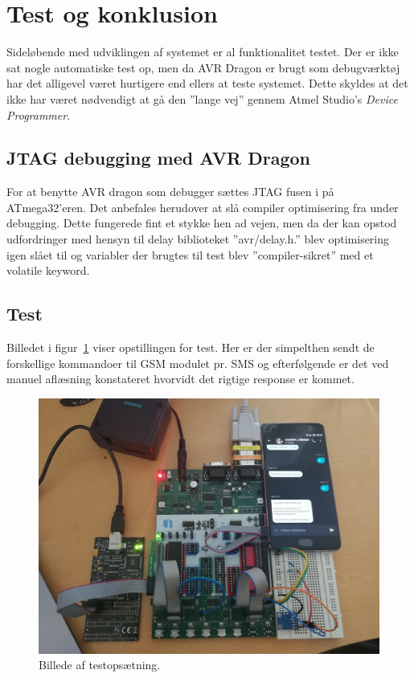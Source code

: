 \section{Test og konklusion}

Sideløbende med udviklingen af systemet er al funktionalitet testet. Der er ikke sat nogle automatiske test op, men da AVR Dragon er brugt som debugværktøj har det alligevel 
været hurtigere end ellers at teste systemet. Dette skyldes at det ikke har været nødvendigt at gå den ''lange vej'' gennem Atmel Studio's \textit{Device Programmer}.

\subsection{JTAG debugging med AVR Dragon}

For at benytte AVR dragon som debugger sættes JTAG fusen i på ATmega32'eren. Det anbefales herudover at slå compiler optimisering fra under debugging. 
Dette fungerede fint et stykke hen ad vejen, men da der kan opstod udfordringer med hensyn til delay biblioteket ''avr/delay.h.'' blev optimisering igen slået til og variabler der brugtes
til test blev ''compiler-sikret'' med et volatile keyword. 

\subsection{Test}

Billedet i figur~\ref{fig:testsetup} viser opstillingen for test. Her er der simpelthen sendt de forskellige kommandoer til GSM modulet pr. SMS og efterfølgende er det ved manuel aflæsning konstateret hvorvidt det rigtige response er kommet.

\begin{figure}[h]
	\centering
	\includegraphics[width=\linewidth]{figs/test_setup}
	\caption{Billede af testopsætning.}
	\label{fig:testsetup}
\end{figure}

